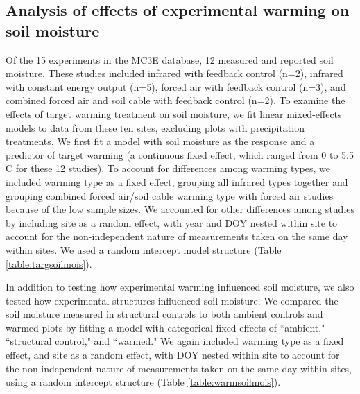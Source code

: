 \documentclass{article}
\begin{document}
\subsection* {Analysis of effects of experimental warming on soil moisture}
Of the 15 experiments in the MC3E database, 12 measured and reported soil moisture. These studies included infrared with feedback control (n=2), infrared with constant energy output (n=5), forced air with feedback control (n=3), and combined forced air and soil cable with feedback control (n=2). To examine the effects of target warming treatment on soil moisture, we fit linear mixed-effects models to data from these ten sites, excluding plots with precipitation treatments. We first fit a model with soil moisture as the response and a predictor of target warming (a continuous fixed effect, which ranged from 0 to 5.5 \degree C for these 12 studies). To account for differences among warming types, we included warming type as a fixed effect, grouping all infrared types together and grouping combined forced air/soil cable warming type with forced air studies because of the low sample sizes. We accounted for other differences among studies by including site as a random effect, with year and DOY nested within site to account for the non-independent nature of measurements taken on the same day within sites.  We used a random intercept model structure (Table \ref{table:targsoilmois}). 

\par In addition to testing how experimental warming influenced soil moisture, we also tested how experimental structures influenced soil moisture. We compared the soil moisture measured in structural controls to both ambient controls and warmed plots by fitting a model with categorical fixed effects of ``ambient," ``structural control," and ``warmed."  We again included warming type as a fixed effect, and site as a random effect, with DOY nested within site to account for the non-independent nature of measurements taken on the same day within sites, using a random intercept structure (Table \ref{table:warmsoilmois}). 
\end{document}
